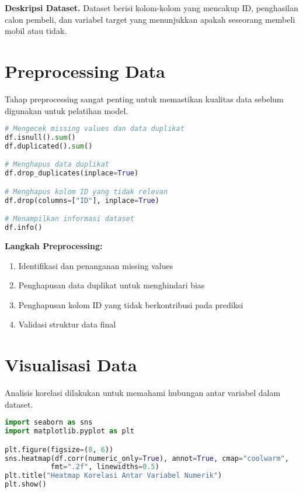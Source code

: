 \documentclass[11pt,a4paper]{article}
\begin{document}
    \noindent\textbf{Deskripsi Dataset.} Dataset berisi kolom-kolom yang mencakup ID, penghasilan calon pembeli, dan variabel target yang menunjukkan apakah seseorang membeli mobil atau tidak.


    \section{Preprocessing Data}
    Tahap preprocessing sangat penting untuk memastikan kualitas data sebelum digunakan untuk pelatihan model.

    \begin{codebox}
        \begin{lstlisting}[language=Python]
# Mengecek missing values dan data duplikat
df.isnull().sum()
df.duplicated().sum()

# Menghapus data duplikat
df.drop_duplicates(inplace=True)

# Menghapus kolom ID yang tidak relevan
df.drop(columns=["ID"], inplace=True)

# Menampilkan informasi dataset
df.info()
        \end{lstlisting}
    \end{codebox}

    \noindent\textbf{Langkah Preprocessing:}
    \begin{enumerate}
        \item Identifikasi dan penanganan missing values
        \item Penghapusan data duplikat untuk menghindari bias
        \item Penghapusan kolom ID yang tidak berkontribusi pada prediksi
        \item Validasi struktur data final
    \end{enumerate}


    \section{Visualisasi Data}
    Analisis korelasi dilakukan untuk memahami hubungan antar variabel dalam dataset.

    \begin{codebox}
        \begin{lstlisting}[language=Python]
import seaborn as sns
import matplotlib.pyplot as plt

plt.figure(figsize=(8, 6))
sns.heatmap(df.corr(numeric_only=True), annot=True, cmap="coolwarm",
           fmt=".2f", linewidths=0.5)
plt.title("Heatmap Korelasi Antar Variabel Numerik")
plt.show()
        \end{lstlisting}
    \end{codebox}
\end{document}
